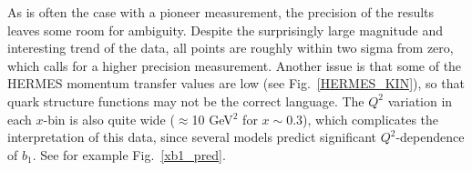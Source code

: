 As is often the case with a pioneer measurement, the precision of the results leaves some
room for ambiguity.  Despite the surprisingly large magnitude and interesting trend of the data, 
all points are roughly within two sigma from zero, which calls for a higher precision measurement.
Another issue is that some of the HERMES momentum transfer values are low 
(see Fig.~\ref{HERMES_KIN}), so that quark structure functions may not be the correct language. 
The $Q^2$ variation in each $x$-bin is also quite wide ($\approx$10 GeV$^2$ for $x\sim 0.3$), which complicates
the interpretation of this data, since  several models predict significant $Q^2$-dependence of
 $b_1$. See for example Fig.~\ref{xb1_pred}.






